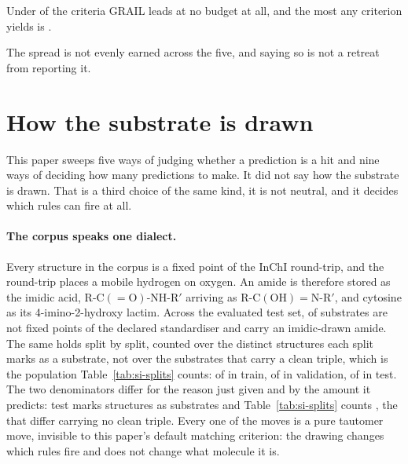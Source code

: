 \documentclass[journal=jcisd8,manuscript=suppinfo,layout=onecolumn]{achemso}
\begin{document}
Under
\numCritNeverLeadsWord{} of the \numCritCriteria{} criteria GRAIL leads at no budget at all, and
the most any criterion yields is \numCritLeadsBestWord{}.

The spread is not evenly earned across the five, and saying so is not a retreat from reporting it.
\section{How the substrate is drawn}
\label{sec:si-presentation}

This paper sweeps five ways of judging whether a prediction is a hit and nine ways of deciding how
many predictions to make. It did not say how the substrate is drawn. That is a third choice of the
same kind, it is not neutral, and it decides which rules can fire at all.

\paragraph{The corpus speaks one dialect.} Every structure in the corpus is a fixed point of the
InChI round-trip, and the round-trip places a mobile hydrogen on oxygen. An amide is therefore
stored as the imidic acid, $\mathrm{R\text{-}C(=O)\text{-}NH\text{-}R'}$ arriving as
$\mathrm{R\text{-}C(OH)=N\text{-}R'}$, and cytosine as its 4-imino-2-hydroxy lactim. Across the
evaluated test set, \numDialectEvalMoved{} of \numDialectEvalN{} substrates are not fixed points
of the declared standardiser and \numDialectEvalImidic{} carry an imidic-drawn amide. The same
holds split by split, counted over the distinct structures each split marks as a substrate, not
over the substrates that carry a clean triple, which is the population
Table~\ref{tab:si-splits} counts: \numDialectTrainMoved{} of \numDialectTrainN{} in train,
\numDialectValMoved{} of \numDialectValN{} in validation, \numDialectTestMoved{} of
\numDialectTestN{} in test. The two denominators differ for the reason just given and by the
amount it predicts: test marks \numDialectTestN{} structures as substrates and
Table~\ref{tab:si-splits} counts \numAssemblyTeststructures{}, the
\numAssemblyTestmarkednotripleWord{} that differ carrying no clean triple. Every one of the
\numDialectEvalMoved{} moves is a pure tautomer move,
invisible to this paper's default matching criterion: the drawing changes which rules fire and
does not change what molecule it is.
\end{document}
